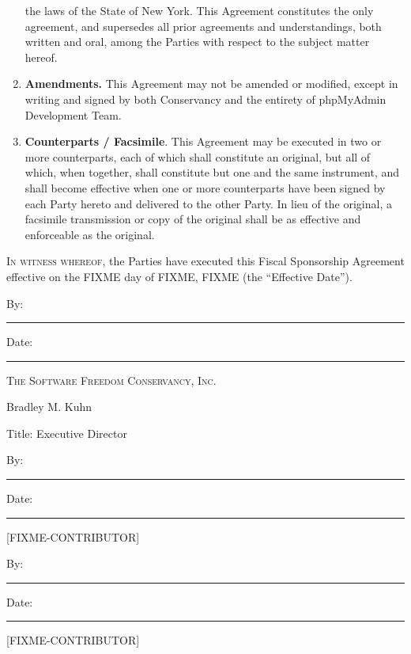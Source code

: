 \documentclass[letterpaper,12pt]{article}
\newcommand{\leadershipbody}{phpMyAdmin Development Team\xspace}
\newcommand{\signature}[1]{
\vspace{2ex}

By: \hspace{0.95em}\rule{0.50\textwidth}{0.2mm} \hfill{}Date: \rule{0.25\textwidth}{0.2mm}

\hspace{2.5em} #1
}
\begin{document}
\begin{enumerate}[label=\arabic*.,ref=\S~\arabic*]
the laws of the State of New York. This Agreement constitutes the
only agreement, and supersedes all prior agreements and understandings,
both written and oral, among the Parties with respect to the subject
matter hereof. 
\item \textbf{Amendments. }This Agreement may not be amended or modified,
except in writing and signed by both Conservancy and the entirety of \leadershipbody. 
\item \textbf{Counterparts / Facsimile}. This Agreement may be executed
in two or more counterparts, each of which shall constitute an original,
but all of which, when together, shall constitute but one and the
same instrument, and shall become effective when one or more counterparts
have been signed by each Party hereto and delivered to the other Party.
In lieu of the original, a facsimile transmission or copy of the original
shall be as effective and enforceable as the original. 
\end{enumerate}
\vfill{}


\textsc{In witness whereof}, the Parties have executed this Fiscal
Sponsorship Agreement effective on the FIXME day of FIXME, FIXME (the
``Effective Date'').

\vspace{3em}


By: \hspace{0.95em}\rule{0.50\textwidth}{0.2mm} \hfill{}Date: \rule{0.25\textwidth}{0.2mm}

\hspace{2.5em} \textsc{The Software Freedom Conservancy, Inc. }

\hspace{2.5em} Bradley M. Kuhn

\hspace{2.5em} Title: Executive Director \\[6ex]

\signature{[FIXME-CONTRIBUTOR]}
\signature{[FIXME-CONTRIBUTOR]}
\end{document}
